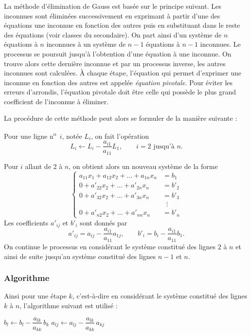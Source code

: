 La méthode d'élimination de Gauss est basée sur le principe suivant. Les
inconnues sont éliminées successivement en exprimant à partir d'une des
équations une inconnue en fonction des autres puis en substituant dans le
reste des équations (voir classes du secondaire). On part ainsi d'un système de
$n$ équations à $n$ inconnues à un système de $n-1$ équations à $n-1$
inconnues. Le processus se poursuit jusqu'à l'obtention d'une équation à une
inconnue. On trouve alors cette dernière inconnue et par un processus inverse,
les autres inconnues sont calculées. À chaque étape, l'équation qui permet
d'exprimer une inconnue en fonction des autres est appelée \emph{équation
pivotale}. Pour éviter les erreurs d'arrondis, l'équation pivotale doit être
celle qui possède le plus grand coefficient de l'inconnue à éliminer.

La procédure de cette méthode peut alors se formuler de la manière suivante :

Pour une ligne n\textsuperscript{o}~$i$, notée $L_i$, on fait l'opération
\[
  L_i \leftarrow L_i - \frac{a_{i1}}{a_{11}}L_1, \qquad i = 2 \text{ jusqu'à } n.
\]

Pour $i$ allant de $2$ à $n$, on obtient alors un nouveau système de la forme
\[
  \left\{
  \begin{aligned}
    a_{11}x_1 + a_{12}x_2 + \dots + a_{1n}x_n &= b_1\\
    0 + a'_{22}x_2 + \dots + a'_{2n}x_n &= b'_2\\
    0 + a'_{32}x_2 + \dots + a'_{3n}x_n &= b'_3\\
    &\;\;\vdots\\
    0 + a'_{n2}x_2 + \dots + a'_{nn}x_n &= b'_n
  \end{aligned}
  \right.
\]
Les coefficients $a'_{ij}$ et $b'_i$ sont donnés par
\[
  a'_{ij} = a_{ij} - \frac{a_{i1}}{a_{11}}a_{1j}, \qquad
  b'_i = b_i - \frac{a_{i1}}{a_{11}}b_1 .
\]
On continue le processus en considérant le système constitué des lignes $2$ à
$n$ et ainsi de suite jusqu'au système constitué des lignes $n-1$ et $n$.

\subsubsection{Algorithme}

Ainsi pour une étape $k$, c'est-à-dire en considérant le système constitué des
lignes $k$ à $n$, l'algorithme suivant est utilisé :

\begin{algo}
    \State $b_l \leftarrow b_l - \dfrac{a_{lk}}{a_{kk}}\,b_k$
      \State $a_{lj} \leftarrow a_{lj} - \dfrac{a_{lk}}{a_{kk}}\,a_{kj}$
    \EndFor
  \EndFor
\end{algo}

